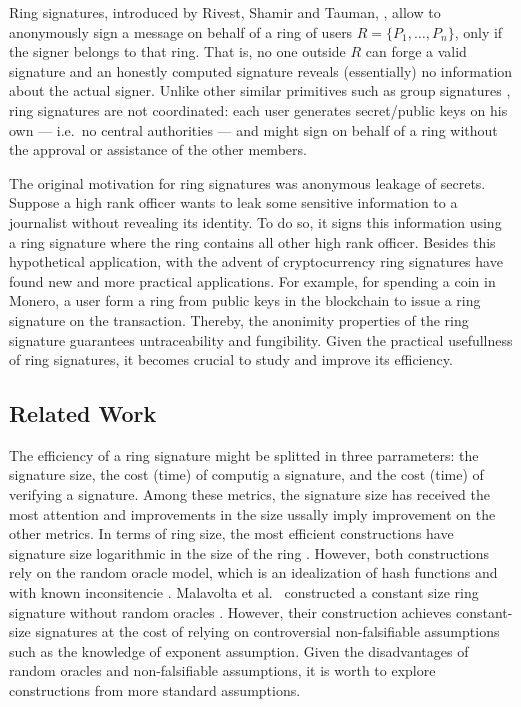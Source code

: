 
Ring signatures, introduced by Rivest, Shamir and Tauman, \cite{AC:RivShaTau01}, allow to anonymously sign a message on behalf of a ring of users $R=\{P_1,\ldots,P_n\}$, only if the signer belongs to that ring. That is, no one outside $R$ can forge a valid signature and  an honestly computed signature reveals (essentially) no information about the actual signer.  
Unlike other similar primitives such as group signatures \cite{EC:ChaVan91}, ring signatures are not coordinated: each user generates secret/public keys on his own --- i.e.~no central authorities --- and might sign on behalf of a ring without the approval or assistance of the other members.

The original motivation for ring signatures was anonymous leakage of secrets. Suppose a high rank officer wants to leak some sensitive information to a journalist without revealing its identity. To do so, it signs this information using a ring signature where the ring contains all other high rank officer. Besides this hypothetical application, with the advent of cryptocurrency ring signatures have found new and more practical applications. For example, for spending a coin in Monero, a user form a ring from public keys in the blockchain to issue a ring signature on the transaction. Thereby, the anonimity properties of the ring signature guarantees untraceability and fungibility. 
Given the practical usefullness of ring signatures, it becomes crucial to study and improve its efficiency.

\subsection{Related Work}
The efficiency of a ring signature might be splitted in three parrameters: the signature size, the cost (time) of computig a signature, and the cost (time) of verifying a signature. Among these metrics, the signature size has received the most attention and improvements in the size ussally imply improvement on the other metrics.
In terms of ring size, the most efficient constructions have signature size logarithmic in the size of the ring \cite{EC:GroKoh15,EC:LLNW16}. However,  both constructions rely on the {random oracle model}, which is an idealization of hash functions and with known inconsitencie \cite{FOCS:GolKal03}. Malavolta et al.~ constructed a constant size ring signature without random oracles \cite{AC:MalSho17}. However, their construction achieves constant-size signatures at the cost of relying on controversial non-falsifiable assumptions \cite{C:Naor03} such as the knowledge of exponent assumption.
Given the disadvantages of random oracles and non-falsifiable assumptions, it is worth to explore constructions from more standard assumptions.

